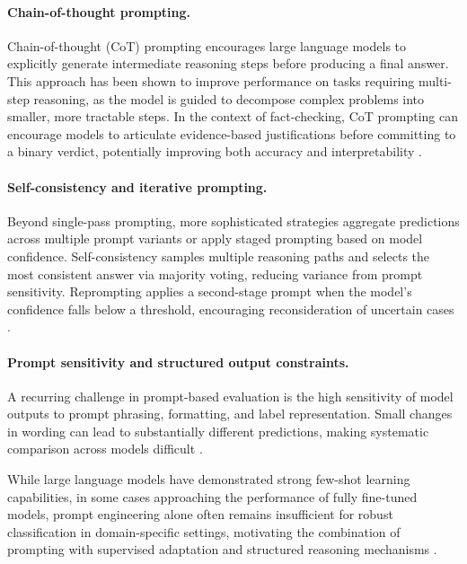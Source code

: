 \paragraph{Chain-of-thought prompting.}
Chain-of-thought (CoT) prompting encourages large language models to explicitly generate intermediate reasoning steps before producing a final answer. This approach has been shown to improve performance on tasks requiring multi-step reasoning, as the model is guided to decompose complex problems into smaller, more tractable steps. In the context of fact-checking, CoT prompting can encourage models to articulate evidence-based justifications before committing to a binary verdict, potentially improving both accuracy and interpretability \cite{wei2023chainofthoughtpromptingelicitsreasoning}.

\paragraph{Self-consistency and iterative prompting.}
Beyond single-pass prompting, more sophisticated strategies aggregate predictions across multiple prompt variants or apply staged prompting based on model confidence. Self-consistency samples multiple reasoning paths and selects the most consistent answer via majority voting, reducing variance from prompt sensitivity. Reprompting applies a second-stage prompt when the model's confidence falls below a threshold, encouraging reconsideration of uncertain cases \cite{wang2023selfconsistencyimproveschainthought}. 

\paragraph{Prompt sensitivity and structured output constraints.}
A recurring challenge in prompt-based evaluation is the high sensitivity of model outputs to prompt phrasing, formatting, and label representation. Small changes in wording can lead to substantially different predictions, making systematic comparison across models difficult \cite{schulhoff2025promptreportsystematicsurvey}.

While large language models have demonstrated strong few-shot learning capabilities, in some cases approaching the performance of fully fine-tuned models, prompt engineering alone often remains insufficient for robust classification in domain-specific settings, motivating the combination of prompting with supervised adaptation and structured reasoning mechanisms \cite{schulhoff2025promptreportsystematicsurvey}.

